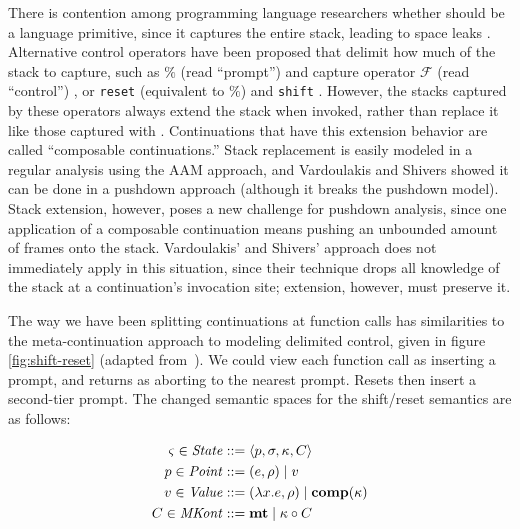 There is contention among programming language researchers whether  should be a language primitive, since it captures the entire stack, leading to space leaks \citep{ianjohnson:kiselyov:against-callcc}.
%
Alternative control operators have been proposed that delimit how much of the stack to capture, such as $\%$ (read ``prompt'') and capture operator ${\mathcal F}$ (read ``control'') \citep{ianjohnson:felleisen:control:1988}, or \texttt{reset} (equivalent to $\%$) and \texttt{shift} \citep{ianjohnson:danvy:filinski:delim:1990}.
%
However, the stacks captured by these operators always extend the stack when invoked, rather than replace it like those captured with .
%
Continuations that have this extension behavior are called ``composable continuations.''
%
Stack replacement is easily modeled in a regular analysis using the AAM approach, and Vardoulakis and Shivers showed it can be done in a pushdown approach (although it breaks the pushdown model).
%
Stack extension, however, poses a new challenge for pushdown analysis, since one application of a composable continuation means pushing an unbounded amount of frames onto the stack.
%
Vardoulakis' and Shivers' approach does not immediately apply in this situation, since their technique drops all knowledge of the stack at a continuation's invocation site; extension, however, must preserve it.

The way we have been splitting continuations at function calls has similarities to the meta-continuation approach to modeling delimited control, given in figure \ref{fig:shift-reset} (adapted from~\citep{ianjohnson:Biernacki2006274}).
%
We could view each function call as inserting a prompt, and returns as aborting to the nearest prompt.
%
Resets then insert a second-tier prompt.
%
The changed semantic spaces for the shift/reset semantics are as follows:

\begin{align*}
  \varsigma \in \mathit{State} &::= \langle p, \sigma, \kappa, C \rangle \\
  p \in \mathit{Point} &::= (e, \rho) \mathrel{\mid} v \\
  v \in \mathit{Value} &::= (\lambda{} x. e, \rho) \mathrel{\mid} \mathbf{comp}(\kappa) \\
  C \in \mathit{MKont} &::= \mathbf{mt} \mathrel{\mid} \kappa\circ C
\end{align*}

